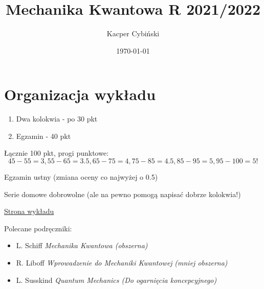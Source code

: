 \documentclass[12pt,a4paper]{report}
\title{Mechanika Kwantowa R 2021/2022}
\author{Kacper Cybiński}
\date{\today}
\newcommand{\link}[2]{{\color{cyan} \href{#1}{#2}}}
\begin{document}
\maketitle

\chapter*{Organizacja wykładu}
\begin{enumerate}
    \item Dwa kolokwia - po 30 pkt
    \item Egzamin - 40 pkt
\end{enumerate}
Łącznie 100 pkt, progi punktowe:
\[45-55 = 3, 55-65 = 3.5, 65-75=4, 75-85=4.5, 85-95 = 5, 95-100=5!\]

Egzamin ustny (zmiana oceny co najwyżej o 0.5)

Serie domowe dobrowolne (ale na pewno pomogą napisać dobrze kolokwia!)

{\color{blue} \link{https://kampus-student2.ckc.uw.edu.pl/course/view.php?id=9707}{Strona wykładu}}


Polecane podręczniki:
\begin{itemize}
    \item L. Schiff \textit{Mechanika Kwantowa (obszerna)}
    \item R. Liboff \textit{Wprowadzenie do Mechaniki Kwantowej} \textit{(mniej obszerna)}
    \item L. Susskind \textit{Quantum Mechanics (Do ogarnięcia koncepcyjnego)}
\end{itemize}
\end{document}
